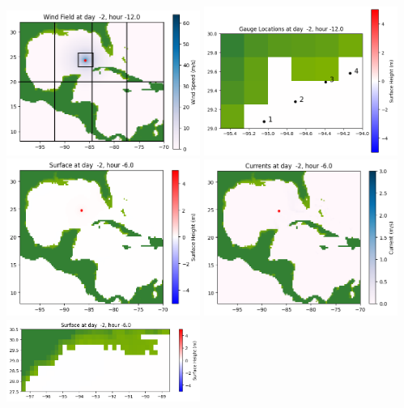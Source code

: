 \documentclass[11pt]{article}
\begin{document}
\vskip 10pt 
\includegraphics[width=0.475\textwidth]{frame0002fig1007.png}
\includegraphics[width=0.475\textwidth]{frame0002fig1008.png}
\vskip 10pt 
\includegraphics[width=0.475\textwidth]{frame0003fig1001.png}
\includegraphics[width=0.475\textwidth]{frame0003fig1002.png}
\vskip 10pt 
\includegraphics[width=0.475\textwidth]{frame0003fig1003.png}
\end{document}
